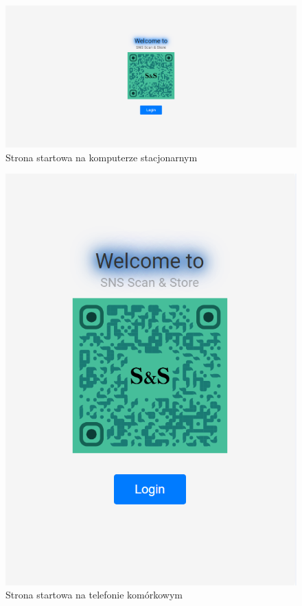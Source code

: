 \documentclass[../main.tex]{subfiles}
\begin{document}
            \begin{figure}[H]
                \centering
                \includegraphics[width=\getImageWidth]{images/app-desktop/app-starting-page-desktop.png}
                \caption{Strona startowa na komputerze stacjonarnym}
                \label{fig:app-starting-page-desktop}
            \end{figure}
            \begin{figure}[H]
                \centering
                \includegraphics[height=\getImageHeight]{images/app-mobile/app-starting-page-mobile.png}
                \caption{Strona startowa na telefonie komórkowym}
                \label{fig:app-starting-page-mobile}
            \end{figure}
\end{document}
